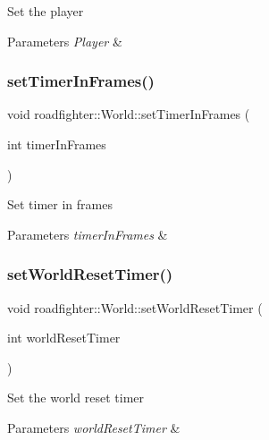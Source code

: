 Set the player 
\begin{DoxyParams}{Parameters}
{\em Player} & \\
\hline
\end{DoxyParams}
\mbox{\label{classroadfighter_1_1World_a4a411b997761a8527dffd6f6462abae1}} 
\subsubsection{\texorpdfstring{set\+Timer\+In\+Frames()}{setTimerInFrames()}}
{\footnotesize\ttfamily void roadfighter\+::\+World\+::set\+Timer\+In\+Frames (\begin{DoxyParamCaption}\item[{int}]{timer\+In\+Frames }\end{DoxyParamCaption})}

Set timer in frames 
\begin{DoxyParams}{Parameters}
{\em timer\+In\+Frames} & \\
\hline
\end{DoxyParams}
\mbox{\label{classroadfighter_1_1World_a1fb8a5fd2a407814e18b2f95b3fd430f}} 
\subsubsection{\texorpdfstring{set\+World\+Reset\+Timer()}{setWorldResetTimer()}}
{\footnotesize\ttfamily void roadfighter\+::\+World\+::set\+World\+Reset\+Timer (\begin{DoxyParamCaption}\item[{int}]{world\+Reset\+Timer }\end{DoxyParamCaption})}

Set the world reset timer 
\begin{DoxyParams}{Parameters}
{\em world\+Reset\+Timer} & \\
\hline
\end{DoxyParams}
\mbox{\label{classroadfighter_1_1World_ab168eec31ad01a882254c5522b354d22}} 
